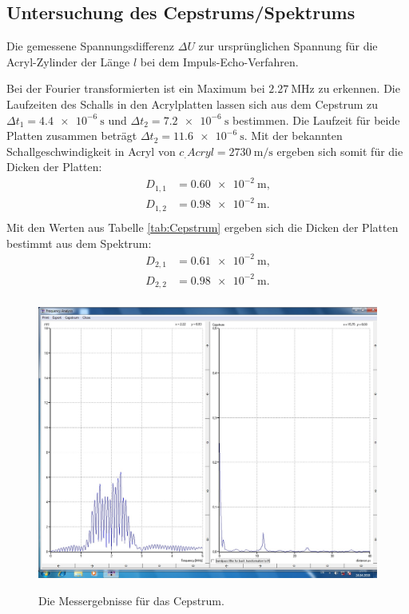 \subsection{Untersuchung des Cepstrums/Spektrums}

\begin{table}
	\centering
	\caption{Die gemessene Spannungsdifferenz $\Delta U$ zur ursprünglichen Spannung für die Acryl-Zylinder der Länge $l$ bei dem Impuls-Echo-Verfahren.}
	
	\label{tab:Cepstrum}
\end{table}

\noindent Bei der Fourier transformierten ist ein Maximum bei $\SI{2.27}{\mega\hertz}$ zu erkennen.
Die Laufzeiten des Schalls in den Acrylplatten lassen sich aus dem Cepstrum zu $\Delta t_1=\SI{4.4e-6}{\second}$ und $\Delta t_2=\SI{7.2e-6}{\second}$ bestimmen. Die Laufzeit für beide Platten zusammen beträgt $\Delta t_2=\SI{11.6e-6}{\second}$. 
Mit der bekannten Schallgeschwindigkeit in Acryl von $c_.{Acryl}=\SI{2730}{\meter\per\second}$ \cite{cAcryl} ergeben sich somit für die Dicken der Platten:
\begin{align*}
D_{1,1}&=\SI{0.60e-2}{\meter}\text{,}\\
D_{1,2}&=\SI{0.98e-2}{\meter}\text{.}\\
\end{align*}
Mit den Werten aus Tabelle \ref{tab:Cepstrum} ergeben sich die Dicken der Platten bestimmt aus dem Spektrum:
\begin{align*}
D_{2,1}&=\SI{0.61e-2}{\meter}\text{,}\\
D_{2,2}&=\SI{0.98e-2}{\meter}\text{.}\\
\end{align*}

\begin{figure}
	\centering
	\caption{Die Messergebnisse für das Cepstrum.}
	\includegraphics[width=\linewidth-70pt,height=\textheight-70pt,keepaspectratio]{content/images/CEPSTRUM.jpg}
	\label{fig:Cepstrum}
\end{figure}

